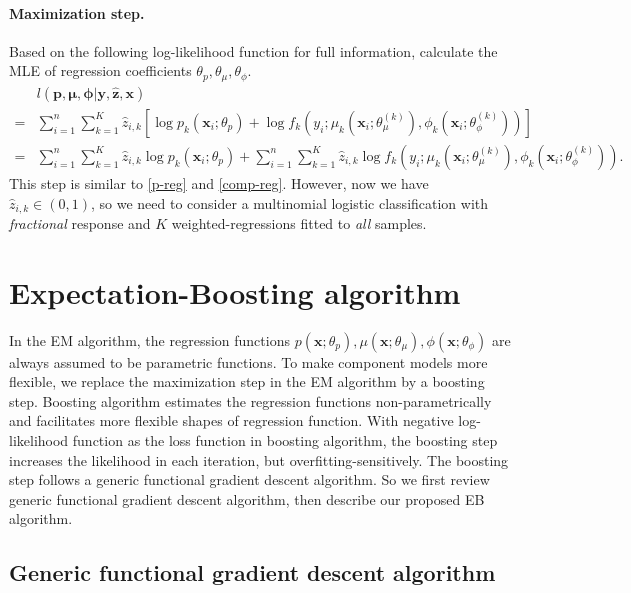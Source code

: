 \documentclass[11pt]{article}
\numberwithin{equation}{section}
\def\bx{\boldsymbol{x}}
\def\by{\boldsymbol{y}}
\def\bp{\boldsymbol{p}}
\def\bmu{\boldsymbol{\mu}}
\def\bphi{\boldsymbol{\phi}}
\def\bz{\boldsymbol{z}}
\begin{document}
\paragraph{Maximization step.}
	Based on the following log-likelihood function for full information, calculate the MLE of regression coefficients  $\theta_p, \theta_\mu, \theta_\phi$.
	\begin{equation}
		\begin{aligned}
			&l(\bp,\bmu,\bphi|\by,\hat{\bz},\bx)\\
			=&\sum_{i=1}^n\sum_{k=1}^K \hat{z}_{i,k}\left[\log p_k(\bx_i;\theta_p) + \log f_k\left(y_i;\mu_k\left(\bx_i;\theta_\mu^{(k)}\right),\phi_k\left(\bx_i;\theta_\phi^{(k)}\right)\right)\right]\\
			=&\sum_{i=1}^n\sum_{k=1}^K \hat{z}_{i,k}\log p_k(\bx_i;\theta_p) + \sum_{i=1}^n\sum_{k=1}^K \hat{z}_{i,k}\log f_k\left(y_i;\mu_k\left(\bx_i;\theta_\mu^{(k)}\right),\phi_k\left(\bx_i;\theta_\phi^{(k)}\right)\right).
		\end{aligned}
	\end{equation}
	This step is similar to \eqref{p-reg} and \eqref{comp-reg}. However, now we have $\hat{z}_{i,k}\in(0,1)$, 
	so we need to consider a multinomial logistic classification with {\it fractional} response and $K$ {weighted}-regressions fitted to {\it all} samples.

\section{Expectation-Boosting algorithm}\label{sec:EB}
In the EM algorithm, the regression functions $p(\bx;\theta_p), \mu(\bx;\theta_\mu), \phi(\bx;\theta_\phi)$ are always assumed to be parametric functions.
To make component models more flexible, we replace the maximization step in the EM algorithm by a boosting step.
Boosting algorithm estimates the regression functions non-parametrically and facilitates more flexible shapes of regression function.
With negative log-likelihood function as the loss function in boosting algorithm, the boosting step increases the likelihood in each iteration, but overfitting-sensitively.
The boosting step follows a generic functional gradient descent algorithm.
So we first review generic functional gradient descent algorithm, then describe our proposed EB algorithm.

\subsection{Generic functional gradient descent algorithm}
\end{document}
